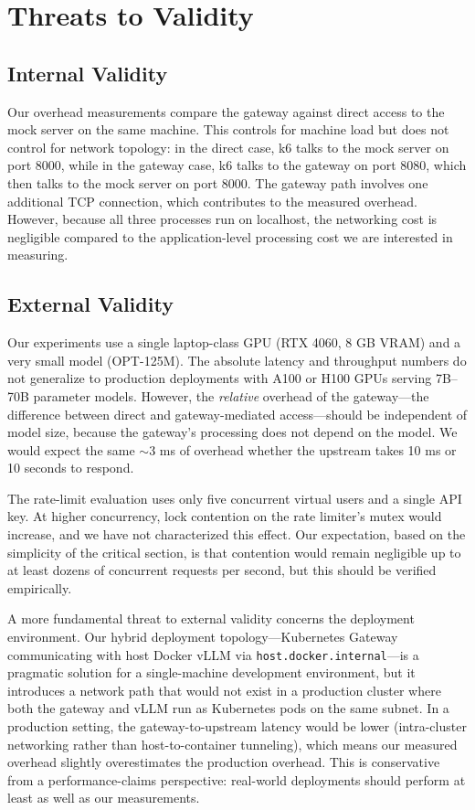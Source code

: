 \documentclass[10pt,journal]{IEEEtran}
\begin{document}
\section{Threats to Validity}

\subsection{Internal Validity}

Our overhead measurements compare the gateway against direct access to the mock server on the same machine. This controls for machine load but does not control for network topology: in the direct case, k6 talks to the mock server on port 8000, while in the gateway case, k6 talks to the gateway on port 8080, which then talks to the mock server on port 8000. The gateway path involves one additional TCP connection, which contributes to the measured overhead. However, because all three processes run on localhost, the networking cost is negligible compared to the application-level processing cost we are interested in measuring.

\subsection{External Validity}

Our experiments use a single laptop-class GPU (RTX 4060, 8 GB VRAM) and a very small model (OPT-125M). The absolute latency and throughput numbers do not generalize to production deployments with A100 or H100 GPUs serving 7B--70B parameter models. However, the \emph{relative} overhead of the gateway---the difference between direct and gateway-mediated access---should be independent of model size, because the gateway's processing does not depend on the model. We would expect the same $\sim$3 ms of overhead whether the upstream takes 10 ms or 10 seconds to respond.

The rate-limit evaluation uses only five concurrent virtual users and a single API key. At higher concurrency, lock contention on the rate limiter's mutex would increase, and we have not characterized this effect. Our expectation, based on the simplicity of the critical section, is that contention would remain negligible up to at least dozens of concurrent requests per second, but this should be verified empirically.

A more fundamental threat to external validity concerns the deployment environment. Our hybrid deployment topology---Kubernetes Gateway communicating with host Docker vLLM via \texttt{host.docker.internal}---is a pragmatic solution for a single-machine development environment, but it introduces a network path that would not exist in a production cluster where both the gateway and vLLM run as Kubernetes pods on the same subnet. In a production setting, the gateway-to-upstream latency would be lower (intra-cluster networking rather than host-to-container tunneling), which means our measured overhead slightly overestimates the production overhead. This is conservative from a performance-claims perspective: real-world deployments should perform at least as well as our measurements.
\end{document}
